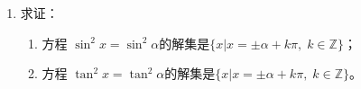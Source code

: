 \begin{enumerate}
\item 求证：
\begin{enumerate}
    \item 方程 $\sin^2x=\sin^2\alpha$的解集是$\{x|x=\pm \alpha+k\pi,\; k\in\mathbb{Z}\}$；
    \item 方程 $\tan^2x=\tan^2\alpha$的解集是$\{x|x=\pm \alpha+k\pi,\; k\in\mathbb{Z}\}$。
\end{enumerate}
\end{enumerate}